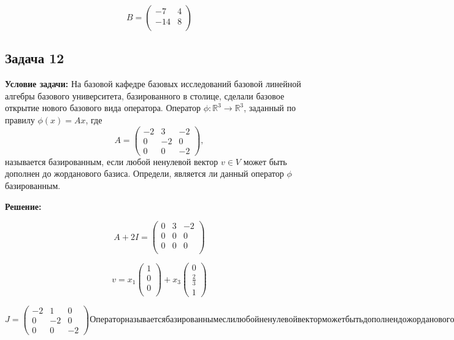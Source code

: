 \documentclass[a4paper,12pt]{article}
\begin{document}
\[
B = \begin{pmatrix}
    -7 & 4 \\
    -14 & 8 \\
\end{pmatrix}
\]



\subsection{Задача 12}
\textbf{Условие задачи:} На базовой кафедре базовых исследований базовой линейной алгебры базового университета, базированного в столице, сделали базовое открытие нового базового вида оператора. Оператор $\phi: \mathbb{R}^3 \to \mathbb{R}^3$, заданный по правилу $\phi(x) = Ax$, где
\[
A =
\begin{pmatrix}
-2 & 3 & -2 \\
0 & -2 & 0 \\
0 & 0 & -2
\end{pmatrix},
\]
называется базированным, если любой ненулевой вектор $v \in V$ может быть дополнен до жорданового базиса. Определи, является ли данный оператор $\phi$ базированным.

\textbf{Решение: }

\[
A + 2I = \begin{pmatrix}
    0 & 3 & -2 \\
    0 & 0 & 0 \\
    0 & 0 & 0 \\
\end{pmatrix}
\]

\[
v = x_1 \begin{pmatrix}
    1 \\
    0\\
    0\\
\end{pmatrix}
+
x_3 \begin{pmatrix}
    0 \\
    \frac{2}{3} \\
    1
\end{pmatrix}
\]

\[
J =
\begin{pmatrix}
    -2 & 1 & 0 \\
    0 & -2 & 0 \\
    0 & 0 & -2 
\end{pmatrix}

Оператор называется базированным если любой ненулевой вектор может быть дополнен до жорданового базиса. 
\]
\end{document}
